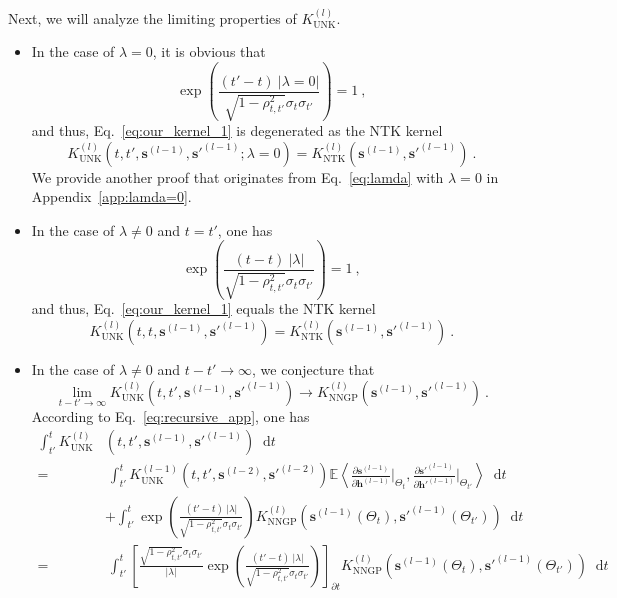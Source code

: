 \documentclass[review,10pt]{JMtemplate}
\newcommand*{\dif}{\mathop{}\!\mathrm{d}}
\begin{document}
Next, we will analyze the limiting properties of $K_{\textrm{UNK}}^{(l)}$.
\begin{itemize}
    \item In the case of $\lambda=0$, it is obvious that 
    \[
    \exp\left( \frac{ (t'-t) ~|\lambda=0|}{\sqrt{1-\rho_{t,t'}^2}\sigma_{t}\sigma_{t'}} \right) = 1 \ ,
    \]
    and thus, Eq.~\eqref{eq:our_kernel_1} is degenerated as the NTK kernel
    \[
    K_{\textrm{UNK}}^{(l)} \left( t, t', \boldsymbol{s}^{(l-1)}, \boldsymbol{s}'^{(l-1)} ; \lambda=0 \right) = K_{\textrm{NTK}}^{(l)} \left(  \boldsymbol{s}^{(l-1)}, \boldsymbol{s}'^{(l-1)} \right)  \ .
    \]
    We provide another proof that originates from Eq.~\eqref{eq:lamda} with $\lambda=0$ in Appendix~\ref{app:lamda=0}.
    \item In the case of $\lambda \neq 0$ and $t=t'$, one has
    \[
    \exp\left( \frac{ (t-t) ~|\lambda|}{\sqrt{1-\rho_{t,t'}^2}\sigma_{t}\sigma_{t'}} \right) = 1 \ ,
    \]
    and thus, Eq.~\eqref{eq:our_kernel_1} equals the NTK kernel
    \[
    K_{\textrm{UNK}}^{(l)} \left( t, t, \boldsymbol{s}^{(l-1)}, \boldsymbol{s}'^{(l-1)} \right) = K_{\textrm{NTK}}^{(l)} \left(  \boldsymbol{s}^{(l-1)}, \boldsymbol{s}'^{(l-1)} \right) \ .
    \]
    \item In the case of $\lambda \neq 0$ and $t-t' \to \infty$, we conjecture that
    \[
    \lim\limits_{t-t' \to \infty} K_{\textrm{UNK}}^{(l)} \left( t, t', \boldsymbol{s}^{(l-1)}, \boldsymbol{s}'^{(l-1)} \right) \to K_{\textrm{NNGP}}^{(l)} \left(  \boldsymbol{s}^{(l-1)}, \boldsymbol{s}'^{(l-1)} \right) \ .
    \]
    According to Eq.~\eqref{eq:recursive_app}, one has
    \[
    \begin{aligned}
       \int_{t'}^t K_{\textrm{UNK}}^{(l)} & \left( t, t', \boldsymbol{s}^{(l-1)}, \boldsymbol{s}'^{(l-1)} \right) \dif t \\
       =&~ \int_{t'}^t K_{\textrm{UNK}}^{(l-1)} \left( t, t',  \boldsymbol{s}^{(l-2)}, \boldsymbol{s}'^{(l-2)} \right) \mathbb{E} \left\langle \frac{\partial \boldsymbol{s}^{(l-1)}}{\partial \boldsymbol{h}^{(l-1)}} \Big|_{\Theta_t},  \frac{\partial \boldsymbol{s}'^{(l-1)}}{\partial \boldsymbol{h}'^{(l-1)}} \Big|_{\Theta_{t'}} \right\rangle \dif t \\
       &+ \int_{t'}^t \exp\left( \frac{ (t'-t) ~|\lambda|}{\sqrt{1-\rho_{t,t'}^2}\sigma_{t}\sigma_{t'}} \right) K_{\textrm{NNGP}}^{(l)} \left( \boldsymbol{s}^{(l-1)}(\Theta_t), \boldsymbol{s}'^{(l-1)}(\Theta_{t'}) \right) \dif t \\
       =&~  \int_{t'}^t \left[ \frac{\sqrt{1-\rho_{t,t'}^2}\sigma_{t}\sigma_{t'}}{|\lambda|} \exp\left( \frac{ (t'-t) ~|\lambda|}{\sqrt{1-\rho_{t,t'}^2}\sigma_{t}\sigma_{t'}} \right) \right]_{\partial t} K_{\textrm{NNGP}}^{(l)} \left( \boldsymbol{s}^{(l-1)}(\Theta_t), \boldsymbol{s}'^{(l-1)}(\Theta_{t'}) \right) \dif t \\

\end{aligned}\]
\end{itemize}
\end{document}
